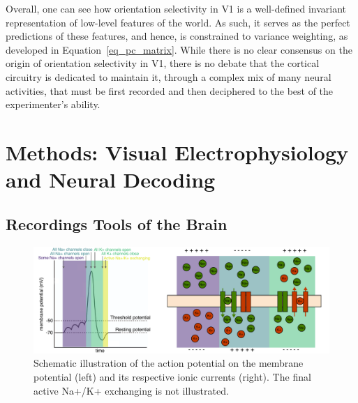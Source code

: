 Overall, one can see how orientation selectivity in \gls{V1} is a well-defined invariant representation of low-level features of the world. As such, it serves as the perfect predictions of these features, and hence, is constrained to variance weighting, as developed in Equation~\ref{eq_pc_matrix}. While there is no clear consensus on the origin of orientation selectivity in \gls{V1}, there is no debate that the cortical circuitry is dedicated to maintain it, through a complex mix of many neural activities, that must be first recorded and then deciphered to the best of the experimenter's ability.



\section{Methods: Visual Electrophysiology and Neural Decoding}
\subsection{Recordings Tools of the Brain}

\begin{figure}[h!tbp]
\vspace{0.1cm}
\centering
\includegraphics[width=1.\textwidth]{fig/chap4_actionpotential.pdf}
\caption[Illustration of the action potential.]{Schematic illustration of the action potential on the membrane potential (left) and its respective ionic currents (right). The final active Na+/K+ exchanging is not illustrated.}
\label{fig_chap4_actionpotential}
\end{figure} 

